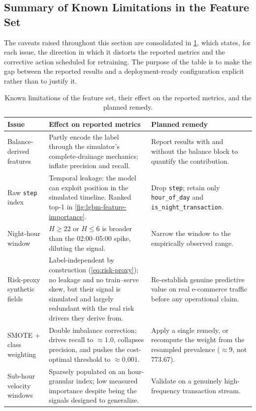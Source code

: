 \subsection{Summary of Known Limitations in the Feature Set}
\label{sec:fe_caveats}

The caveats raised throughout this section are consolidated in \cref{tab:fe_caveats}, which states, for each issue, the direction in which it distorts the reported metrics and the corrective action scheduled for retraining. The purpose of the table is to make the gap between the reported results and a deployment-ready configuration explicit rather than to justify it.

\begin{table}[htbp]
\centering
\footnotesize
\setlength{\tabcolsep}{6pt}
\renewcommand{\arraystretch}{1.25}
\caption{Known limitations of the feature set, their effect on the reported metrics, and the planned remedy.}
\label{tab:fe_caveats}
\begin{tabularx}{\textwidth}{@{}l >{\raggedright\arraybackslash}X >{\raggedright\arraybackslash}X@{}}
\toprule
\textbf{Issue} & \textbf{Effect on reported metrics} & \textbf{Planned remedy} \\
\midrule
Balance-derived features & Partly encode the label through the simulator's complete-drainage mechanics; inflate precision and recall. & Report results with and without the balance block to quantify the contribution. \\
Raw \texttt{step} index & Temporal leakage: the model can exploit position in the simulated timeline. Ranked top-1 in \cref{fig:lgbm-feature-importance}. & Drop \texttt{step}; retain only \texttt{hour\_of\_day} and \texttt{is\_night\_transaction}. \\
Night-hour window & $H \ge 22$ or $H \le 6$ is broader than the 02:00--05:00 spike, diluting the signal. & Narrow the window to the empirically observed range. \\
Risk-proxy synthetic fields & Label-independent by construction (\cref{eq:risk-proxy}); no leakage and no train--serve skew, but their signal is simulated and largely redundant with the real risk drivers they derive from. & Re-establish genuine predictive value on real e-commerce traffic before any operational claim. \\
SMOTE $+$ class weighting & Double imbalance correction; drives recall to $\approx 1.0$, collapses precision, and pushes the cost-optimal threshold to $\approx 0.001$. & Apply a single remedy, or recompute the weight from the resampled prevalence ($\approx 9$, not $773.67$). \\
Sub-hour velocity windows & Sparsely populated on an hour-granular index; low measured importance despite being the signals designed to generalize. & Validate on a genuinely high-frequency transaction stream. \\
\bottomrule
\end{tabularx}
\end{table}

